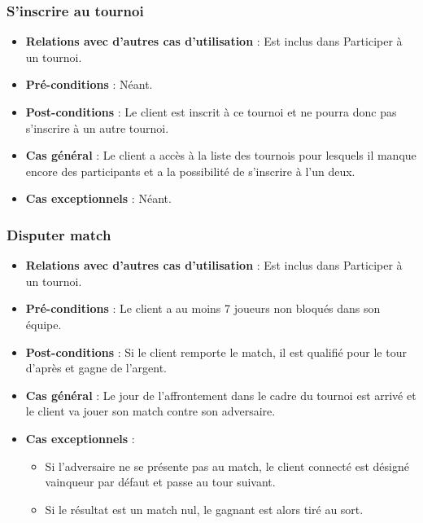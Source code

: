 \documentclass[a4paper,titlepage]{scrreprt}
\begin{document}
    \subsubsection{S'inscrire au tournoi}
      \begin{itemize}
        \item \textbf{Relations avec d'autres cas d'utilisation}  : Est inclus dans Participer à un tournoi.
        \item \textbf{Pré-conditions} : Néant.
        \item \textbf{Post-conditions} : Le client est inscrit à ce tournoi et ne pourra donc pas s'inscrire à un autre tournoi.
        \item \textbf{Cas général} : Le client a accès à la liste des tournois pour lesquels il manque encore des participants et a la possibilité de s'inscrire à l'un deux.
        \item \textbf{Cas exceptionnels} : Néant.
      \end{itemize}

        \subsubsection{Disputer match}
      \begin{itemize}
        \item \textbf{Relations avec d'autres cas d'utilisation}  : Est inclus dans Participer à un tournoi.
        \item \textbf{Pré-conditions} : Le client a au moins 7 joueurs non bloqués dans son équipe.
        \item \textbf{Post-conditions} : Si le client remporte le match, il est qualifié pour le tour d'après et gagne de l'argent.
        \item \textbf{Cas général} : Le jour de l'affrontement dans le cadre du tournoi est arrivé et le client va jouer son match contre son adversaire.
        \item \textbf{Cas exceptionnels} :
          \begin{itemize}
            \item Si l'adversaire ne se présente pas au match, le client connecté est désigné vainqueur par défaut et passe au tour suivant.
            \item Si le résultat est un match nul, le gagnant est alors tiré au sort.
          \end{itemize}
      \end{itemize}
\end{document}
